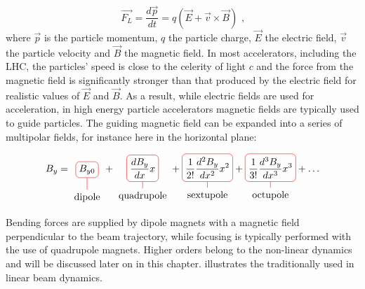 \begin{equation}
    \vec{F_L} = \dfrac{d\vec{p}}{dt} = q (\vec{E} + \vec{v} \times \vec{B}) \text{ ,}
    \label{equation:lorentz_force}
\end{equation}
where \(\vec{p}\) is the particle momentum, \(q\) the particle charge, \(\vec{E}\) the electric field, \(\vec{v}\) the particle velocity and \(\vec{B}\) the magnetic field.
In most accelerators, including the \gls{LHC}, the particles' speed is close to the celerity of light \(c\) and the force from the magnetic field is significantly stronger than that produced by the electric field for realistic values of \(\vec{E}\) and \(\vec{B}\).
As a result, while electric fields are used for acceleration, in high energy particle accelerators magnetic fields are typically used to guide particles.
The guiding magnetic field can be expanded into a series of multipolar fields, for instance here in the horizontal plane:

\begin{align}
    B_{y} = 
    \tikz[baseline]{
        \node[draw=red,rounded corners,anchor=base] (m1)
        {\(\displaystyle B_{y0}\)};
        \node[below of=m1] (l1) {dipole};
        \draw[-,red] (l1) -- (m1);
    }
    +
    \tikz[baseline]{
        \node[draw=red,rounded corners,anchor=base] (m2)
        {\(\displaystyle \frac{dB_{y}}{dx} x\)};
        \node[below of=m2] (l2) {quadrupole};
        \draw[-,red] (l2) -- (m2);
    }
    +
    \tikz[baseline]{
        \node[draw=red,rounded corners,anchor=base] (m3)
        {\(\displaystyle \frac{1}{2!} \frac{d^2B_{y}}{dx^2} x^2\)};
        \node[below of=m3] (l2) {sextupole};
        \draw[-,red] (l2) -- (m3);
    }
    +
    \tikz[baseline]{
        \node[draw=red,rounded corners,anchor=base] (m4)
        {\(\displaystyle \frac{1}{3!} \frac{d^3B_{y}}{dx^3} x^3\)};
        \node[below of=m4] (l2) {octupole};
        \draw[-,red] (l2) -- (m4);
    }
    + \ldots
    \label{equation:magnetic_field_expansion}
\end{align}

Bending forces are supplied by dipole magnets with a magnetic field perpendicular to the beam trajectory, while focusing is typically performed with the use of quadrupole magnets.
Higher orders belong to the non-linear dynamics and will be discussed later on in this chapter.
 illustrates the  traditionally used in linear beam dynamics.

